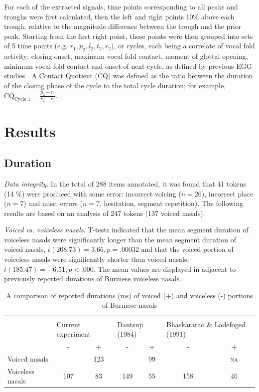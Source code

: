 \documentclass[12pt]{article}
\begin{document}
For each of the extracted signals, time points corresponding to all peaks and troughs were first calculated, then the left and right points 10\% above each trough, relative to the magnitude difference between the trough and the prior peak. Starting from the first right point, these points were then grouped into sets of 5 time points (e.g. $r_1, p_2, l_2, t_2, r_2$), or cycles, each being a correlate of vocal fold activity: closing onset, maximum vocal fold contact, moment of glottal opening, minimum vocal fold contact and onset of next cycle, as defined by previous EGG studies \citep{mooshammer2010acoustic,kuang2014vocal}. A Contact Quotient (CQ) was defined as the ratio between the duration of the closing phase of the cycle to the total cycle duration; for example, $\textrm{CQ}_{\textrm{Cycle 1}} = \frac{p_2 - r_1}{r_2 - r_1}$.

\section{Results}

\subsection{Duration}

\emph{Data integrity}. In the total of 288 items annotated, it was found that 41 tokens (14 \%) were produced with some error: incorrect voicing ($n = 26$), incorrect place ($n = 7$) and misc. errors ($n = 7$, hesitation, segment repetition). The following results are based on an analysis of 247 tokens (137 voiced nasals).

\emph{Voiced vs. voiceless nasals}. T-tests indicated that the mean segment duration of voiceless nasals were significantly longer than the mean segment duration of voiced nasals, $t(208.73) = 3.66, p = .00032$ and that the voiced portion of voiceless nasals were significantly shorter than voiced nasals, $t(185.47) = -6.51, p < .000$. The mean values are displayed in  adjacent to previously reported durations of Burmese voiceless nasals.

\begin{table}[h]
\centering
\caption{A comparison of reported durations (ms) of voiced (+) and voiceless (-) portions of Burmese nasals}
\label{tab:durations}
\begin{tabular}{lcccccc}
\toprule\\
 & \multicolumn{2}{l}{Current experiment} & \multicolumn{2}{l}{Dantsuji (1984)} & \multicolumn{2}{l}{Bhaskararao \& Ladefoged  (1991)} \\
 \midrule
 & -          & +         & -                 & +               & -               & +             \\
Voiced nasals    &            & 123          &                   & 99              &                 & \textsc{na}      \\
Voiceless nasals & 107        & 83        & 149               & 55              & 158             & 46  \\
\bottomrule         
\end{tabular}
\end{table}
\end{document}
